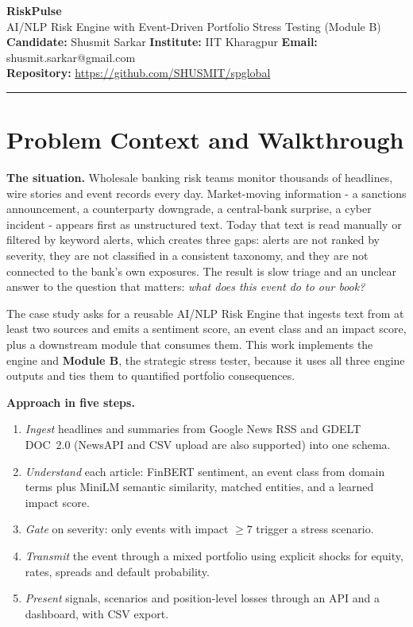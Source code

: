 \documentclass[11pt,a4paper]{article}
\begin{document}
\begin{center}
{\LARGE\bfseries\color{accent} RiskPulse}\\[3pt]
{\large AI/NLP Risk Engine with Event-Driven Portfolio Stress Testing (Module B)}\\[6pt]
{\small \textbf{Candidate:} Shusmit Sarkar \quad \textbf{Institute:} IIT Kharagpur \quad \textbf{Email:} shusmit.sarkar@gmail.com\\
\textbf{Repository:} \url{https://github.com/SHUSMIT/spglobal}}
\end{center}
\vspace{-4pt}\hrule\vspace{4pt}


\section{Problem Context and Walkthrough}
\textbf{The situation.} Wholesale banking risk teams monitor thousands of headlines, wire stories and event records every day. Market-moving information - a sanctions announcement, a counterparty downgrade, a central-bank surprise, a cyber incident - appears first as unstructured text. Today that text is read manually or filtered by keyword alerts, which creates three gaps: alerts are not ranked by severity, they are not classified in a consistent taxonomy, and they are not connected to the bank's own exposures. The result is slow triage and an unclear answer to the question that matters: \emph{what does this event do to our book?}

The case study asks for a reusable AI/NLP Risk Engine that ingests text from at least two sources and emits a sentiment score, an event class and an impact score, plus a downstream module that consumes them. This work implements the engine and \textbf{Module B}, the strategic stress tester, because it uses all three engine outputs and ties them to quantified portfolio consequences.

\textbf{Approach in five steps.}
\begin{enumerate}[leftmargin=1.5em]
\item \emph{Ingest} headlines and summaries from Google News RSS and GDELT DOC~2.0 (NewsAPI and CSV upload are also supported) into one schema.
\item \emph{Understand} each article: FinBERT sentiment, an event class from domain terms plus MiniLM semantic similarity, matched entities, and a learned impact score.
\item \emph{Gate} on severity: only events with impact $\ge 7$ trigger a stress scenario.
\item \emph{Transmit} the event through a mixed portfolio using explicit shocks for equity, rates, spreads and default probability.
\item \emph{Present} signals, scenarios and position-level losses through an API and a dashboard, with CSV export.
\end{enumerate}
\end{document}

